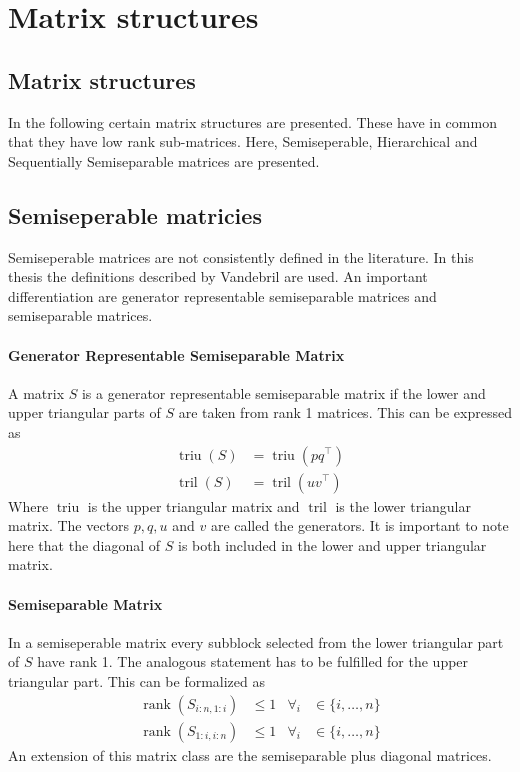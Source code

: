 \documentclass[doctype=mastersthesis,BCOR=15mm,biblatex]{ldvbook}%
\DeclareMathOperator{\rank}{rank}
\DeclareMathOperator{\triu}{triu}
\DeclareMathOperator{\tril}{tril}
\begin{document}



\section{Matrix structures}

\subsection{Matrix structures}
In the following certain matrix structures are presented.
These have in common that they have low rank sub-matrices.
Here, Semiseperable, Hierarchical and Sequentially Semiseparable matrices are presented.

\subsection{Semiseperable matricies}
Semiseperable matrices are not consistently defined in the literature. 
In this thesis the definitions described by Vandebril \cite{vandebril_bibliography_2005,vandebril_matrix_2007} are used.
An important differentiation are generator representable semiseparable matrices and semiseparable matrices.
\paragraph{Generator Representable Semiseparable Matrix}
A matrix $S$ is a generator representable semiseparable matrix if the lower and upper triangular parts of $S$ are taken from rank 1 matrices.
This can be expressed as 
\begin{align}
	\triu(S) &= \triu(pq^\top)\\
	\tril(S) &= \tril(uv^\top)
\end{align}
Where $\triu$ is the upper triangular matrix and $\tril$ is the lower triangular matrix. The vectors $p,q,u$ and $v$ are called the generators.
It is important to note here that the diagonal of $S$ is both included in the lower and upper triangular matrix.

\paragraph{Semiseparable Matrix}
In a semiseperable matrix every subblock selected from the lower triangular part of $S$ have rank 1. The analogous statement has to be fulfilled for the upper triangular part.
This can be formalized as 
\begin{align}
	\rank(S_{i:n,1:i}) &\leq 1 & \forall_i &\in\{i,\dots,n\}\\
	\rank(S_{1:i,i:n}) &\leq 1 & \forall_i &\in\{i,\dots,n\}
\end{align}
An extension of this matrix class are the semiseparable plus diagonal matrices.
\end{document}
